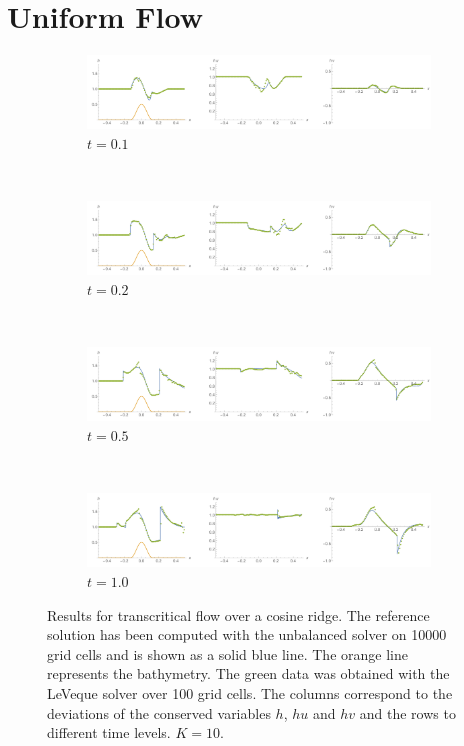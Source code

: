 \section{Uniform Flow}

\begin{figure}
  \centering
  \begin{subfigure}{\textwidth}
    \includegraphics[width=\textwidth]{diagrams/results-flow-1}
    \caption{$t = 0.1$}
    \label{fig:results-flow-1}
  \end{subfigure} \\
  \begin{subfigure}{\textwidth}
    \includegraphics[width=\textwidth]{diagrams/results-flow-2}
    \caption{$t = 0.2$}
    \label{fig:results-flow-2}
  \end{subfigure} \\
  \begin{subfigure}{\textwidth}
    \includegraphics[width=\textwidth]{diagrams/results-flow-5}
    \caption{$t = 0.5$}
    \label{fig:results-flow-5}
  \end{subfigure} \\
  \begin{subfigure}{\textwidth}
    \includegraphics[width=\textwidth]{diagrams/results-flow-10}
    \caption{$t = 1.0$}
    \label{fig:results-flow-10}
  \end{subfigure}
  \caption{Results for transcritical flow over a cosine ridge. The reference solution has been computed with the unbalanced solver on 10000 grid cells and is shown as a solid blue line. The orange line represents the bathymetry. The green data was obtained with the LeVeque solver over 100 grid cells. The columns correspond to the deviations of the conserved variables $h$, $hu$ and $hv$ and the rows to different time levels. $K = 10$.}
  \label{fig:results-flow}
\end{figure}

